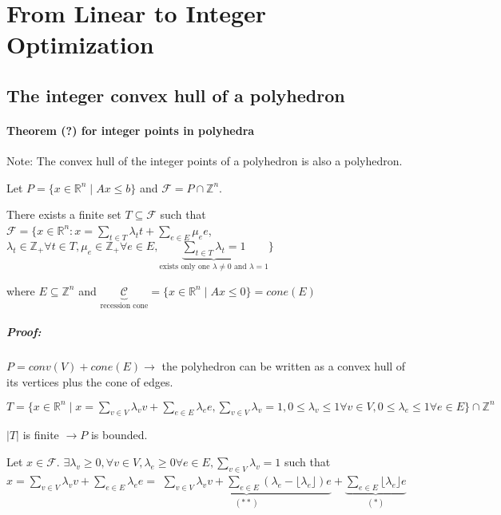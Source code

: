 \documentclass[main]{subfiles}
\begin{document}

\section{From Linear to Integer Optimization}

\subsection{The integer convex hull of a polyhedron }
\paragraph{Theorem (?) for integer points in polyhedra}
Note: The convex hull of the integer points of a polyhedron is also a
polyhedron.

Let $P = \{ x \in \mathbb{R}^n \mid Ax \leq b \}$ and $\mathcal{F} = P \cap 
\mathbb{Z}^n$.

There exists a finite set $T \subseteq \mathcal{F}$ such that \\
$\mathcal{F} = \{ x \in \mathbb{R}^n : x = \sum_{t \in T} \lambda_{t}t +
\sum_{e \in E} \mu_{e}e$, $\lambda_t \in \mathbb{Z}_+ \forall t \in T, \mu_e
\in \mathbb{Z}_+ \forall e \in E, \underbrace{\sum_{t \in T} \lambda_t = 1}
_{\text{exists only one $\lambda \neq 0$ and $\lambda = 1$}} \}$

where $E \subseteq \mathbb{Z}^n$ and $\underbrace{\mathcal{C}}_{\text{recession
cone}} = \{ x \in \mathbb{R}^n \mid Ax \leq 0 \} = cone(E)$

\subparagraph{Proof:}
$P = conv(V) + cone(E) \rightarrow$ the polyhedron can be written as a convex
hull of its vertices plus the cone of edges.

$T = \{x \in \mathbb{R}^n \mid x = \sum_{v \in V} \lambda_v v + \sum_{e \in E}
\lambda_e e, \sum_{v \in V} \lambda_v = 1, 0 \leq \lambda_v \leq 1 \forall v
\in V, 0 \leq \lambda_e \leq 1 \forall e \in E \} \cap \mathbb{Z}^n$

$|T|$ is finite $\rightarrow P$ is bounded.

Let $x \in \mathcal{F}$. $\exists \lambda_v \geq 0, \forall v \in V, \lambda_e
\geq 0 \forall e \in E, \sum_{v \in V} \lambda_v = 1$ such that $x = \sum_{v
\in V} \lambda_v v + \sum_{e \in E} \lambda_e e =$
$\underbrace{\sum_{v \in V} \lambda_v v + \sum_{e \in E} (\lambda_e - \lfloor
\lambda_e \rfloor)e}_{(**)} + \underbrace{\sum_{e \in E} \lfloor \lambda_e
\rfloor e}_{(*)}$
\end{document}
